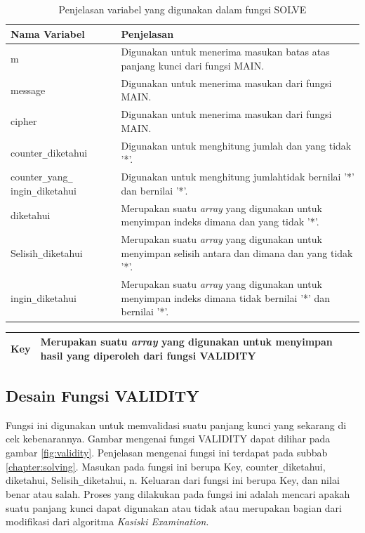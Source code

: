 	\begin{table}[H]
	 	\caption{Penjelasan variabel yang digunakan dalam fungsi SOLVE}
		\begin{tabular}   {|p{3cm}|p{6cm}|}\hline
		Nama Variabel&Penjelasan \\ \hline
		m&Digunakan untuk menerima masukan batas atas panjang kunci dari fungsi MAIN. \\ \hline
		message&Digunakan untuk menerima masukan \plaintext dari fungsi MAIN.\\ \hline
		cipher&Digunakan untuk menerima masukan \ciphertext dari fungsi MAIN. \\ \hline
		counter\verb|_|diketahui&Digunakan untuk menghitung jumlah \plaintext dan \ciphertext yang tidak '*'. \\ \hline
		counter\verb|_|yang\verb|_| ingin\verb|_|diketahui&Digunakan untuk menghitung jumlah\ciphertext tidak bernilai '*' dan \plaintext bernilai '*'. \\ \hline
		diketahui&Merupakan suatu \textit{array} yang digunakan untuk menyimpan indeks dimana \plaintext dan \ciphertext yang tidak '*'. \\ \hline
		Selisih\verb|_|diketahui&Merupakan suatu \textit{array} yang digunakan untuk menyimpan selisih antara \plaintext dan \ciphertext dimana \plaintext dan \ciphertext yang tidak '*'. \\ \hline
		ingin\verb|_|diketahui&Merupakan suatu \textit{array} yang digunakan untuk menyimpan indeks dimana  \ciphertext tidak bernilai '*' dan \plaintext bernilai '*'. \\ \hline
		\end{tabular}%
		\label{tab:solvar}
	\end{table}
  	\begin{table}[H]
	 	
		\begin{tabular}   {|p{3cm}|p{6cm}|}\hline
		
		
		Key&Merupakan suatu \textit{array} yang digunakan untuk menyimpan hasil yang diperoleh dari fungsi VALIDITY \\ \hline
		\end{tabular}%
		\label{tab:solvar}
	\end{table}	
	
	
	\subsection{Desain Fungsi VALIDITY}
	Fungsi ini digunakan untuk memvalidasi suatu panjang kunci yang sekarang di cek kebenarannya. Gambar mengenai fungsi VALIDITY dapat dilihar pada gambar \ref{fig:validity}. Penjelasan mengenai fungsi ini terdapat pada subbab \ref{chapter:solving}. Masukan pada fungsi ini berupa Key, counter\verb|_|diketahui, diketahui, Selisih\verb|_|diketahui, n. Keluaran dari fungsi ini berupa Key, dan nilai benar atau salah. Proses yang dilakukan pada fungsi ini adalah mencari apakah suatu panjang kunci dapat digunakan atau tidak atau merupakan bagian dari modifikasi dari algoritma \textit{Kasiski Examination}. 
	
